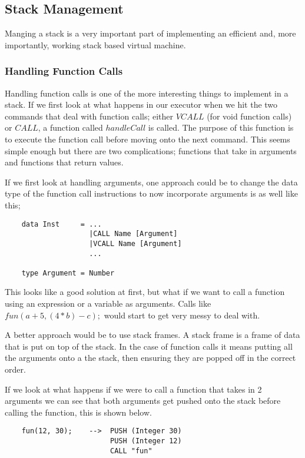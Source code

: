 \subsection{Stack Management}

Manging a stack is a very important part of implementing an efficient and, more importantly, working stack based virtual machine. 

\subsubsection{Handling Function Calls}

Handling function calls is one of the more interesting things to implement in a stack. If we first look at what happens in our executor when we hit the two commands that deal with function calls; either $VCALL$ (for void function calls) or $CALL$, a function called $handleCall$  is called. The purpose of this function is to execute the function call before moving onto the next command. This seems simple enough but there are two complications; functions that take in arguments and functions that return values.

If we first look at handling arguments, one approach could be to change the data type of the function call instructions to now incorporate arguments is as well like this;

\begin{lstlisting}
	data Inst     = ...
	                |CALL Name [Argument]
	                |VCALL Name [Argument]
	                ...
				
	type Argument = Number
\end{lstlisting}        

This looks like a good solution at first,  but what if we want to call a function using an expression or a variable as arguments. Calls like $fun(a+5,(4*b)-c);$ would start to get very messy to deal with. 

A better approach would be to use stack frames. A stack frame is a frame of data that is put on top of the stack. In the case of function calls it means putting all the arguments onto a the stack, then ensuring they are popped off in the correct order.   

If we look at what happens if we were to call a function that takes in 2 arguments we can see that both arguments get pushed onto the stack before calling the function, this is shown below.

\begin{lstlisting}
	fun(12, 30); 	-->  PUSH (Integer 30)
	                     PUSH (Integer 12)
        	             CALL "fun"	
\end{lstlisting}

